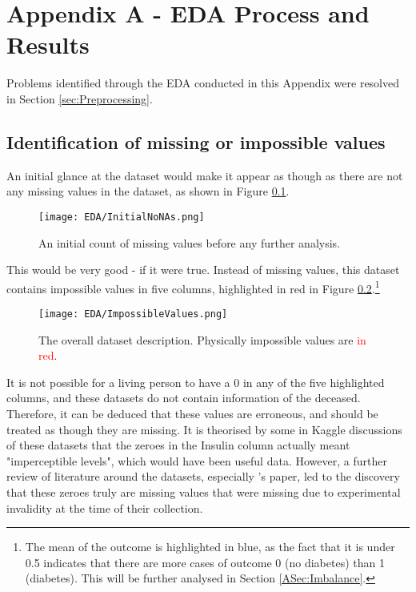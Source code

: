 \begingroup
\renewcommand\thechapter{A}
\titleformat{\chapter}[display]
{\normalfont\huge\bfseries}{}{20pt}{\Huge}
\setcounter{section}{0} %

\chapter*{Appendix A - EDA Process and Results}
Problems identified through the EDA conducted in this Appendix were resolved in Section \ref{sec:Preprocessing}.

\section{Identification of missing or impossible values}
An initial glance at the dataset would make it appear as though as there are not any missing values in the dataset, as shown in Figure \ref{fig:InitialNoNAs}.

\begin{figure}[H]
    \centering
    \texttt{[image: EDA/InitialNoNAs.png]}
    \caption{An initial count of missing values before any further analysis.}
    \label{fig:InitialNoNAs}
\end{figure}

\para This would be very good - if it were true. Instead of missing values, this dataset contains impossible values in five columns, highlighted in red in 
Figure \ref{fig:ImpossibleValues}.\footnote{The mean of the outcome is highlighted in blue, as the fact that it is under 0.5 indicates that there are more 
cases of outcome 0 (no diabetes) than 1 (diabetes). This will be further analysed in Section \ref{ASec:Imbalance}.}

\begin{figure}[H]
    \centering
    \texttt{[image: EDA/ImpossibleValues.png]}
    \caption{The overall dataset description. Physically impossible values are \textcolor{red}{in red}.}
    \label{fig:ImpossibleValues}
\end{figure}

\pagebreak
\para It is not possible for a living person to have a 0 in any of the five highlighted columns, and these datasets do not contain information of the deceased.
Therefore, it can be deduced that these values are erroneous, and should be treated as though they are missing. It is theorised by some in Kaggle discussions of these 
datasets that the zeroes in the Insulin column actually meant "imperceptible levels", which would have been useful data. However, a further review of literature around the datasets,
especially \textcite{hayashi_rule_2016}'s paper, led to the discovery that these zeroes truly are missing values that were missing due to experimental invalidity at the time 
of their collection.

